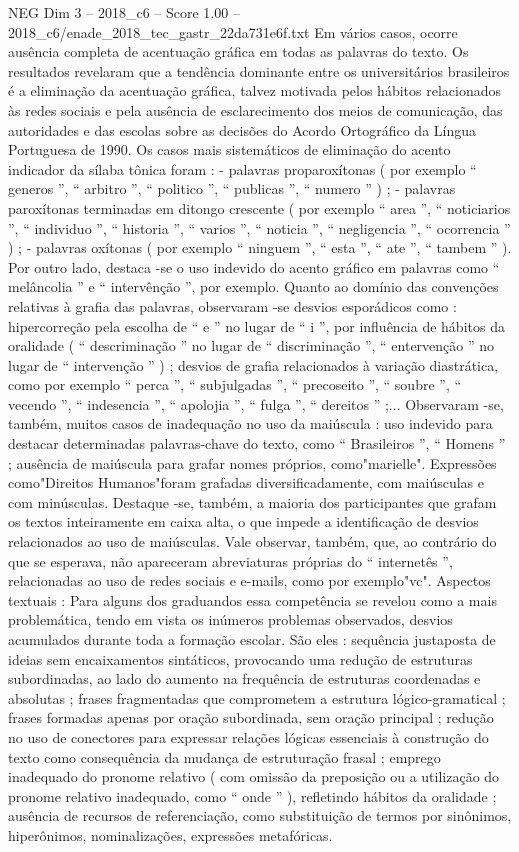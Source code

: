 \begin{textsample}{NEG Dim 3 – 2018\_c6 – Score 1.00 – 2018\_c6/enade\_2018\_tec\_gastr\_22da731e6f.txt}
Em vários casos, ocorre ausência completa de acentuação gráfica em todas as palavras do texto.
Os resultados revelaram que a tendência dominante entre os universitários brasileiros é a eliminação da acentuação gráfica, talvez motivada pelos hábitos relacionados às redes sociais e pela ausência de esclarecimento dos meios de comunicação, das autoridades e das escolas sobre as decisões do Acordo Ortográfico da Língua Portuguesa de 1990.
Os casos mais sistemáticos de eliminação do acento indicador da sílaba tônica foram : - palavras proparoxítonas ( por exemplo “ generos ”, “ arbitro ”, “ politico ”, “ publicas ”, “ numero ” ) ; - palavras paroxítonas terminadas em ditongo crescente ( por exemplo “ area ”, “ noticiarios ”, “ individuo ”, “ historia ”, “ varios ”, “ noticia ”, “ negligencia ”, “ ocorrencia ” ) ; - palavras oxítonas ( por exemplo “ ninguem ”, “ esta ”, “ ate ”, “ tambem ” ).
Por outro lado, destaca -se o uso indevido do acento gráfico em palavras como “ melâncolia ” e “ intervênção ”, por exemplo.
Quanto ao domínio das convenções relativas à grafia das palavras, observaram -se desvios esporádicos como : hipercorreção pela escolha de “ e ” no lugar de “ i ”, por influência de hábitos da oralidade ( “ descriminação ” no lugar de “ discriminação ”, “ entervenção ” no lugar de “ intervenção ” ) ; desvios de grafia relacionados à variação diastrática, como por exemplo “ perca ”, “ subjulgadas ”, “ precoseito ”, “ soubre ”, “ vecendo ”, “ indesencia ”, “ apolojia ”, “ fulga ”, “ dereitos ” ;...
Observaram -se, também, muitos casos de inadequação no uso da maiúscula : uso indevido para destacar determinadas palavras-chave do texto, como “ Brasileiros ”, “ Homens ” ; ausência de maiúscula para grafar nomes próprios, como"marielle".
Expressões como"Direitos Humanos"foram grafadas diversificadamente, com maiúsculas e com minúsculas.
Destaque -se, também, a maioria dos participantes que grafam os textos inteiramente em caixa alta, o que impede a identificação de desvios relacionados ao uso de maiúsculas.
Vale observar, também, que, ao contrário do que se esperava, não apareceram abreviaturas próprias do “ internetês ”, relacionadas ao uso de redes sociais e e-mails, como por exemplo"vc".
Aspectos textuais : Para alguns dos graduandos essa competência se revelou como a mais problemática, tendo em vista os inúmeros problemas observados, desvios acumulados durante toda a formação escolar.
São eles : sequência justaposta de ideias sem encaixamentos sintáticos, provocando uma redução de estruturas subordinadas, ao lado do aumento na frequência de estruturas coordenadas e absolutas ; frases fragmentadas que comprometem a estrutura lógico-gramatical ; frases formadas apenas por oração subordinada, sem oração principal ; redução no uso de conectores para expressar relações lógicas essenciais à construção do texto como consequência da mudança de estruturação frasal ; emprego inadequado do pronome relativo ( com omissão da preposição ou a utilização do pronome relativo inadequado, como “ onde ” ), refletindo hábitos da oralidade ; ausência de recursos de referenciação, como substituição de termos por sinônimos, hiperônimos, nominalizações, expressões metafóricas.

\end{textsample}

